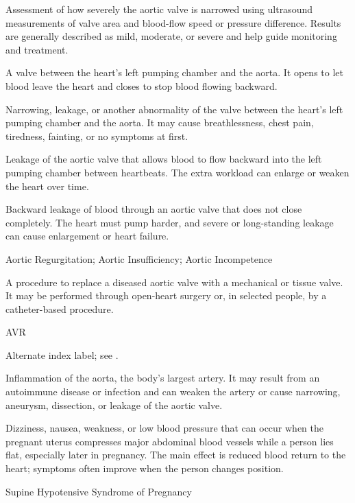  Assessment of how severely the aortic valve is narrowed using ultrasound measurements of valve area and blood-flow speed or pressure difference. Results are generally described as mild, moderate, or severe and help guide monitoring and treatment.

 A valve between the heart’s left pumping chamber and the aorta. It opens to let blood leave the heart and closes to stop blood flowing backward.

 Narrowing, leakage, or another abnormality of the valve between the heart’s left pumping chamber and the aorta. It may cause breathlessness, chest pain, tiredness, fainting, or no symptoms at first.

 Leakage of the aortic valve that allows blood to flow backward into the left pumping chamber between heartbeats. The extra workload can enlarge or weaken the heart over time.

 Backward leakage of blood through an aortic valve that does not close completely. The heart must pump harder, and severe or long-standing leakage can cause enlargement or heart failure.

\synonyms
Aortic Regurgitation; Aortic Insufficiency; Aortic Incompetence

 A procedure to replace a diseased aortic valve with a mechanical or tissue valve. It may be performed through open-heart surgery or, in selected people, by a catheter-based procedure.

\synonyms
AVR

 Alternate index label; see .

 Inflammation of the aorta, the body’s largest artery. It may result from an autoimmune disease or infection and can weaken the artery or cause narrowing, aneurysm, dissection, or leakage of the aortic valve.

 Dizziness, nausea, weakness, or low blood pressure that can occur when the pregnant uterus compresses major abdominal blood vessels while a person lies flat, especially later in pregnancy. The main effect is reduced blood return to the heart; symptoms often improve when the person changes position.

\synonyms
Supine Hypotensive Syndrome of Pregnancy

